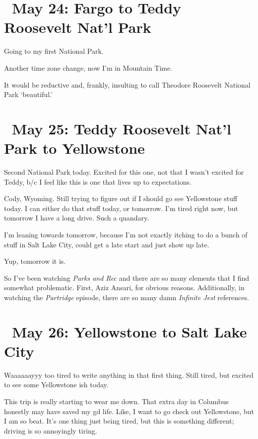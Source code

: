 \documentclass[../butidigress.tex]{subfiles}
\begin{document}
\section{\ May 24: Fargo to Teddy Roosevelt Nat'l Park}
Going to my first National Park.

\entryskip

Another time zone change, now I'm in Mountain Time.

It would be reductive and, frankly, insulting to call Theodore Roosevelt National Park `beautiful.'

\section{\ May 25: Teddy Roosevelt Nat'l Park to Yellowstone}
Second National Park today.
Excited for this one, not that I wasn't excited for Teddy, b/c I feel like this is one that lives up to expectations.

\entryskip

Cody, Wyoming.
Still trying to figure out if I should go see Yellowstone stuff today.
I can either do that stuff today, or tomorrow.
I'm tired right now, but tomorrow I have a long drive.
Such a quandary.

I'm leaning towards tomorrow, because I'm not exactly itching to do a bunch of stuff in Salt Lake City, could get a late start and just show up late.

Yup, tomorrow it is.

So I've been watching \textit{Parks and Rec} and there are so many elements that I find somewhat problematic.
First, Aziz Ansari, for obvious reasons.
Additionally, in watching the \textit{Partridge} episode, there are so many damn \textit{Infinite Jest} references.

\section{\ May 26: Yellowstone to Salt Lake City}

\entryskip

Waaaaaayyy too tired to write anything in that first thing.
Still tired, but excited to see some Yellowstone ish today.

This trip is really starting to wear me down.
That extra day in Columbus honestly may have saved my gd life.
Like, I want to go check out Yellowstone, but I am so beat.
It's one thing just being tired, but this is something different; driving is so annoyingly tiring.
\end{document}
